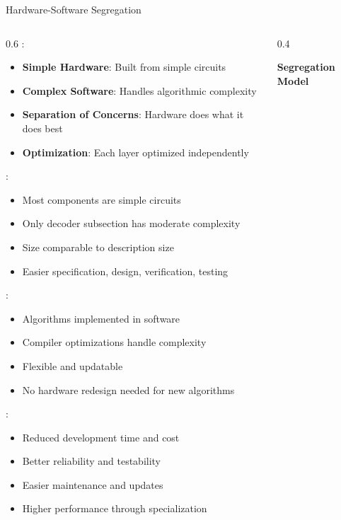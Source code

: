 \begin{frame}{Hardware-Software Segregation}
\begin{columns}
\begin{column}{0.6\textwidth}
:
\begin{itemize}
\item \textbf{Simple Hardware}: Built from simple circuits
\item \textbf{Complex Software}: Handles algorithmic complexity
\item \textbf{Separation of Concerns}: Hardware does what it does best
\item \textbf{Optimization}: Each layer optimized independently
\end{itemize}

\vspace{0.3cm}
:
\begin{itemize}
\item Most components are simple circuits
\item Only decoder subsection has moderate complexity
\item Size comparable to description size
\item Easier specification, design, verification, testing
\end{itemize}

\vspace{0.3cm}
:
\begin{itemize}
\item Algorithms implemented in software
\item Compiler optimizations handle complexity
\item Flexible and updatable
\item No hardware redesign needed for new algorithms
\end{itemize}

\vspace{0.3cm}
:
\begin{itemize}
\item Reduced development time and cost
\item Better reliability and testability
\item Easier maintenance and updates
\item Higher performance through specialization
\end{itemize}
\end{column}
\begin{column}{0.4\textwidth}
\begin{center}
\textbf{Segregation Model}
\vspace{0.3cm}


\end{center}
\end{column}
\end{columns}
\end{frame}
